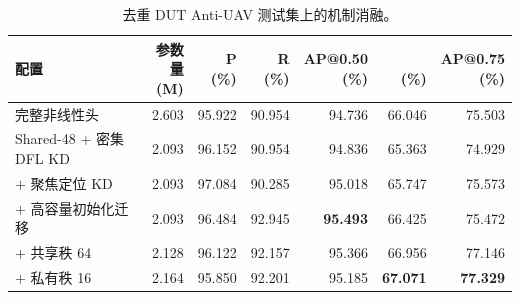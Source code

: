 \begin{table}[!t]
\caption{去重 DUT Anti-UAV 测试集上的机制消融。\label{tab:mechanism}}
\centering\srpatablesetup
\begin{tabular}{p{}rrrrrr}\toprule
配置 & \shortstack{参数量\\(M)} & \shortstack{P\\(\%)} & \shortstack{R\\(\%)} & \shortstack{AP@0.50\\(\%)} & \shortstack{\mapall{}\\(\%)} & \shortstack{AP@0.75\\(\%)}\\\midrule
完整非线性头 & 2.603 & 95.922 & 90.954 & 94.736 & 66.046 & 75.503\\
Shared-48 + 密集 DFL KD & 2.093 & 96.152 & 90.954 & 94.836 & 65.363 & 74.929\\
$+$ 聚焦定位 KD & 2.093 & 97.084 & 90.285 & 95.018 & 65.747 & 75.573\\
$+$ 高容量初始化迁移 & 2.093 & 96.484 & 92.945 & \textbf{95.493} & 66.425 & 75.472\\
$+$ 共享秩 64 & 2.128 & 96.122 & 92.157 & 95.366 & 66.956 & 77.146\\
$+$ 私有秩 16 & 2.164 & 95.850 & 92.201 & 95.185 & \textbf{67.071} & \textbf{77.329}\\\bottomrule
\end{tabular}
\end{table}
